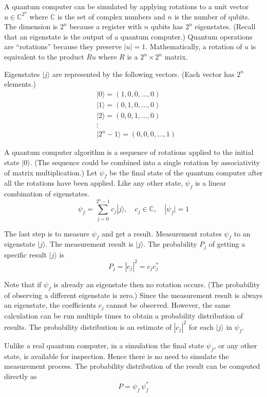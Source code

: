 \documentclass[12pt]{article}
\begin{document}
A quantum computer can be simulated by applying rotations to a
unit vector
$u\in\mathbb{C}^{2^n}$ where $\mathbb{C}$ is the set of complex numbers
and $n$ is the number of qubits.
The dimension is $2^n$ because a register with $n$ qubits
has $2^n$ eigenstates.
(Recall that an eigenstate is the output of a quantum computer.)
Quantum operations are ``rotations'' because they preserve $|u|=1$.
Mathematically, a rotation of $u$ is equivalent to the product $Ru$
where $R$ is a $2^n\times2^n$ matrix.

\bigskip
Eigenstates $|j\rangle$ are represented by the following vectors.
(Each vector has $2^n$ elements.)
\begin{align*}
&|0\rangle=(1,0,0,\dots,0)
\\
&|1\rangle=(0,1,0,\ldots,0)
\\
&|2\rangle=(0,0,1,\ldots,0)
\\
&\vdots
\\
&|2^n-1\rangle=(0,0,0,\ldots,1)
\end{align*}

A quantum computer algorithm is a sequence of rotations
applied to the initial state $|0\rangle$.
(The sequence could be combined into a single rotation
by associativity of matrix multiplication.)
Let $\psi_f$ be the final state of the quantum computer
after all the rotations have been applied.
Like any other state, $\psi_f$ is a linear combination of eigenstates.
\begin{equation*}
\psi_f=\sum_{j=0}^{2^n-1}c_j|j\rangle,
\quad
c_j\in\mathbb C,
\quad
|\psi_f|=1
\end{equation*}

The last step is to measure $\psi_f$ and get a result.
Measurement rotates $\psi_f$ to an eigenstate $|j\rangle$.
The measurement result is $|j\rangle$.
The probability $P_j$ of getting a specific result $|j\rangle$ is
\begin{equation*}
P_j=|c_j|^2=c_jc_j^*
\end{equation*}

Note that if $\psi_f$ is already an eigenstate then no rotation occurs.
(The probability of observing a different eigenstate is zero.)
Since the measurement result is always an eigenstate,
the coefficients $c_j$ cannot be observed.
However, the same calculation can be run multiple times
to obtain a probability distribution of results.
The probability distribution is an estimate
of $|c_j|^2$ for each $|j\rangle$ in $\psi_f$.

\bigskip
Unlike a real quantum computer, in a simulation
the final state $\psi_f$, or any other state, is available for inspection.
Hence there is no need to simulate the measurement process.
The probability distribution of the result can be computed directly as
\begin{equation*}
P=\psi_f\,\psi_f^*
\end{equation*}
\end{document}
